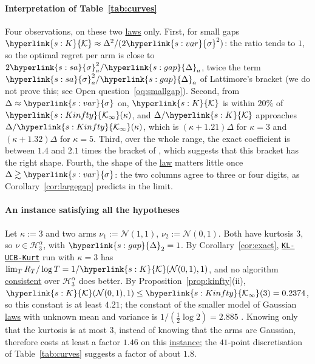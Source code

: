 \documentclass[11pt]{article}
\newcommand{\sy}[2]{{\hyperlink{#1}{#2}}}
\newcommand{\term}[2]{\hyperlink{#1}{#2}}
\newcommand{\sd}{\sy{s:var}{\sigma}}
\newcommand{\gap}{\sy{s:gap}{\Delta}}
\newcommand{\sda}{\sy{s:sa}{\sigma}}
\newcommand{\Kc}{\sy{s:K}{\mathcal{K}}}
\newcommand{\Kinfty}{\sy{s:Kinfty}{\mathcal{K}_{\infty}}}
\newcommand{\algo}{\hyperref[alg:kucb]{\texttt{KL-UCB-Kurt}}}
\begin{document}
\paragraph{Interpretation of Table~\ref{tab:curves}} Four observations, on these two \term{w:law}{laws} only. First, for small gaps
$\Kc\approx\Delta^2/(2\sd^2)$: the ratio tends to $1$, so the optimal regret per arm is close to $2\sda_a^2/\gap_a$, twice the term
$\sda_a^2/\gap_a$ of Lattimore's bracket (we do not prove this; see Open question~\ref{oq:smallgap}). Second, from
$\Delta\approx\sd$ on, $\Kc$ is within $20\%$ of $\Kinfty(\kappa)$, and $\Delta/\Kc$ approaches $\Delta/\Kinfty(\kappa)$, which is
$(\kappa+1.21)\Delta$ for $\kappa=3$ and $(\kappa+1.32)\Delta$ for $\kappa=5$. Third, over the whole range, the exact coefficient is between $1.4$ and $2.1$ times the bracket of
\citet[Theorem~2]{L17}, which suggests that this bracket has the right shape. Fourth, the shape of the \term{w:law}{law} matters
little once $\Delta\gtrsim\sd$: the two columns agree to three or four digits, as Corollary~\ref{cor:largegap} predicts
in the limit.

\paragraph{An instance satisfying all the hypotheses} Let $\kappa:=3$ and two arms $\nu_1:=\mathcal N(1,1)$, $\nu_2:=\mathcal N(0,1)$. Both
have kurtosis $3$, so $\nu\in\mathcal H_3^\alpha$, with $\gap_2=1$. By Corollary~\ref{cor:exact}, \algo{} run with $\kappa=3$ has
$\lim_TR_T/\log T=1/\Kc(\mathcal N(0,1),1)$, and no algorithm \term{w:consistent}{consistent} over $\mathcal H_3^\alpha$ does better. By
Proposition~\ref{prop:kinfty}(ii), $\Kc(\mathcal N(0,1),1)\le\Kinfty(3)=0.2374$, so this constant is at least $4.21$; the constant
of the smaller model of Gaussian \term{w:law}{laws} with unknown mean and variance is $1/(\frac12\log2)=2.885$ \citep[equations~(2)--(3)]{HT14}.
Knowing only that the kurtosis is at most $3$, instead of knowing that the arms are Gaussian, therefore costs at
least a factor $1.46$ on this \term{w:instance}{instance}; the $41$-point discretisation of Table~\ref{tab:curves} suggests a factor
of about $1.8$.
\end{document}
